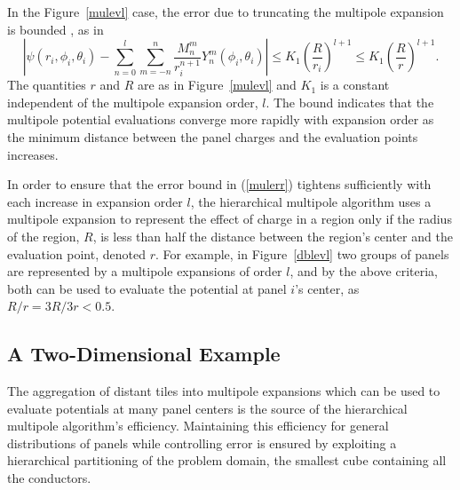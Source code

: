 In the Figure~\ref{mulevl} case,
the error due to truncating the
multipole expansion is bounded \cite{greeng88}, as in 
\begin{equation}
\left| \psi(r_i, \phi_i , \theta_i ) - 
\sum_{n=0}^{l} \sum_{m=-n}^{n}
\frac{M^m_n}{r_i^{n+1}} Y^m_n(\phi_i , \theta_i ) \right| \leq K_1
\left( \frac{R}{r_i} \right)^{l+1} \leq K_1 \left( \frac{R}{r} \right)^{l+1}.
\label{mulerr}
\end{equation}
The quantities $r$ and $R$ are as in Figure~\ref{mulevl} and $K_1$ is
a constant independent of the multipole expansion order, $l$. The
bound indicates that the multipole potential evaluations converge
more rapidly with expansion order as the minimum distance between the
panel charges and the evaluation points increases.


In order to ensure that the error bound in (\ref{mulerr}) tightens
sufficiently with each increase in expansion order $l$, the
hierarchical multipole algorithm uses a
multipole expansion  to represent the effect of charge in a
region only if the radius of the region, $ R $, is less than half the
distance between the region's center and the evaluation point, denoted
$ r $. For example, in Figure~\ref{dblevl} two groups of panels
are represented by a multipole expansions of order $l$, and by the
above criteria, both can be used to evaluate the potential at panel
$i$'s center, as $R/r=3R/3r<0.5$.


\subsection{A Two-Dimensional Example}

The aggregation of distant tiles into multipole expansions which can be
used to evaluate potentials at many panel centers is the source of the
hierarchical multipole algorithm's efficiency.  Maintaining this
efficiency for general distributions of panels while controlling error
is ensured by exploiting a hierarchical partitioning of the problem
domain, the smallest cube containing all the conductors.


